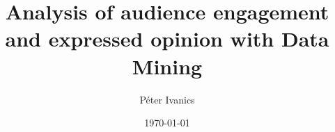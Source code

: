 \documentclass[english]{tktltiki}
\begin{document}
\onehalfspacing

\title{Analysis of audience engagement and expressed opinion with Data Mining}
\author{P\'eter Ivanics}

\date{\today}

\maketitle

\end{document}
